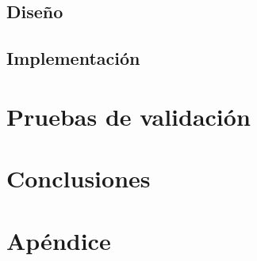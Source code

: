 \documentclass[11pt,a4paper]{book}
\begin{document}
\section{Diseño}


\section{Implementación}


\chapter{Pruebas de validación}


\chapter{Conclusiones}


\printbibliography[heading=bibnumbered]

\appendix
\chapter{Apéndice}

\end{document}
